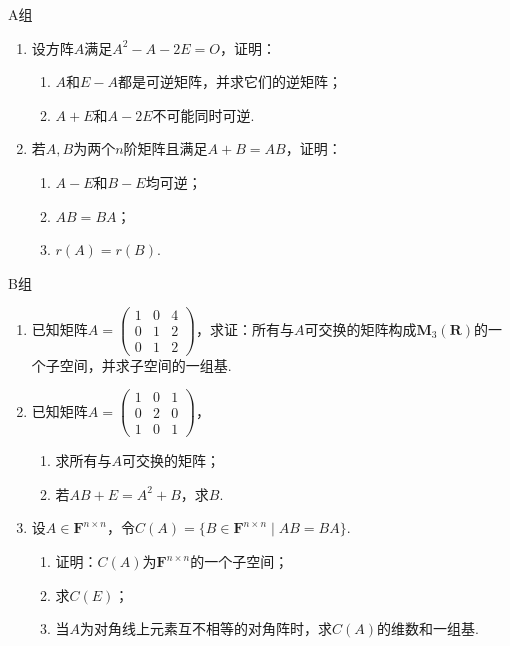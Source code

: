\centerline{\heiti A组}
\begin{enumerate}
    \item 设方阵$A$满足$A^2-A-2E=O$，证明：
          \begin{enumerate}
              \item $A$和$E-A$都是可逆矩阵，并求它们的逆矩阵；

              \item $A+E$和$A-2E$不可能同时可逆.
          \end{enumerate}

    \item 若$A,B$为两个$n$阶矩阵且满足$A+B=AB$，证明：
          \begin{enumerate}
              \item $A-E$和$B-E$均可逆；

              \item $AB=BA$；

              \item $r(A)=r(B)$.
          \end{enumerate}
\end{enumerate}

\centerline{\heiti B组}
\begin{enumerate}
    \item 已知矩阵$A=\begin{pmatrix}
                  1 & 0 & 4 \\ 0 & 1 & 2 \\ 0 & 1 & 2
              \end{pmatrix}$，求证：所有与$A$可交换的矩阵构成$\mathbf{M}_3(\mathbf{R})$的一个子空间，并求子空间的一组基.

    \item 已知矩阵$A=\begin{pmatrix}
                  1 & 0 & 1 \\ 0 & 2 & 0 \\ 1 & 0 & 1
              \end{pmatrix}$，
          \begin{enumerate}
              \item 求所有与$A$可交换的矩阵；

              \item 若$AB+E=A^2+B$，求$B$.
          \end{enumerate}

    \item 设$A \in \mathbf{F}^{n \times n}$，令$C(A)=\{B \in \mathbf{F}^{n \times n} \mid AB=BA\}$.
          \begin{enumerate}
              \item 证明：$C(A)$为$\mathbf{F}^{n \times n}$的一个子空间；

              \item 求$C(E)$；

              \item 当$A$为对角线上元素互不相等的对角阵时，求$C(A)$的维数和一组基.
          \end{enumerate}
\end{enumerate}

